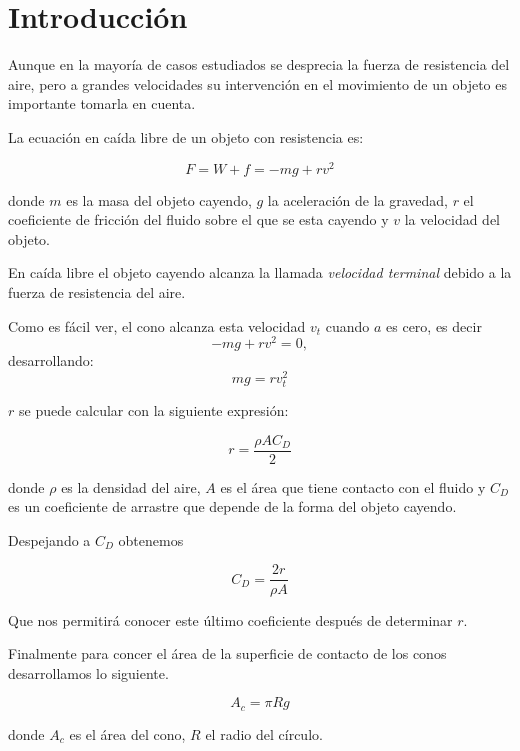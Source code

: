 \section{Introducción}

Aunque en la mayoría de casos estudiados se desprecia
la fuerza de resistencia del aire, pero a grandes velocidades
su intervención en el movimiento de un objeto es importante tomarla 
en cuenta.

La ecuación en caída libre de un objeto con resistencia es:

\begin{equation}
    F = W + f = -mg + rv^2
    \label{int_caidalibre}
\end{equation}

donde $m$ es la masa del objeto cayendo, $g$ la aceleración de la
gravedad, $r$ el coeficiente de fricción del fluido sobre el que se esta
cayendo y $v$ la velocidad del objeto.

En caída libre el objeto cayendo alcanza la llamada \textit{velocidad terminal}
debido a la fuerza de resistencia del aire.

Como es fácil ver, el cono alcanza esta velocidad $v_t$ cuando $a$ es cero, es decir
\[
    -mg + rv^2 = 0,
\]
desarrollando:
\[
    mg = rv^2_t
\]

$r$ se puede calcular con la siguiente expresión:

\begin{equation}
    r = \frac{\rho A C_D}{2}
    \label{int_calcoef}
\end{equation}

donde $\rho$ es la densidad del aire, $A$ es el área que tiene
contacto con el fluido y $C_D$ es un coeficiente de arrastre
que depende de la forma del objeto cayendo.

Despejando a $C_D$ obtenemos

\begin{equation}
    C_D = \frac{2r}{\rho A}
    \label{int_valorDeR}
\end{equation}

Que nos permitirá conocer este último coeficiente después de determinar
$r$.

Finalmente para concer el área de la superficie de contacto 
de los conos desarrollamos lo siguiente.

\begin{equation}
    A_c = \pi R g
    \label{AreaCono}
\end{equation}

donde $A_c$ es el área del cono, $R$ el radio del círculo.

